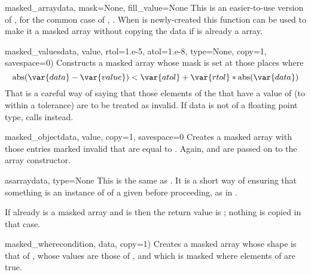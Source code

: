 \begin{methoddesc}[MaskedArray]{masked_array}{data, mask=None, fill_value=None}
   This is an easier-to-use version of ,
   for the common case of , . When
    is newly-created this function can be used to make it a masked
   array without copying the data if  is already a \module{\numarray}
   array.
\end{methoddesc}

\begin{methoddesc}[MaskedArray]{masked_values}{data, value, rtol=1.e-5, atol=1.e-8, type=None, copy=1, savespace=0)}
   Constructs a masked array whose mask is set at those places where 
   \begin{equation}
      \abs(\var{data} - \var{value}) < \var{atol} + \var{rtol} * \abs(\var{data})
   \end{equation}
   That is a careful way of saying that those elements of the  that
   have a value of  (to within a tolerance) are to be treated as
   invalid.  If data is not of a floating point type, calls
    instead.
\end{methoddesc}

\begin{methoddesc}[MaskedArray]{masked_object}{data, value, copy=1, savespace=0}
   Creates a masked array with those entries marked invalid that are equal to
   . Again,  and  are passed on to the
   \module{\numarray} array constructor.
\end{methoddesc}

\begin{methoddesc}[MaskedArray]{asarray}{data, type=None}
   This is the same as . It is a short way
   of ensuring that something is an instance of  of a given
    before proceeding, as in .
   
   If  already is a masked array and  is 
   then the return value is ; nothing is copied in that case.
\end{methoddesc}

\begin{methoddesc}[MaskedArray]{masked_where}{condition, data, copy=1)}
   Creates a masked array whose shape is that of , whose values
   are those of , and which is masked where elements of
    are true.
\end{methoddesc}

